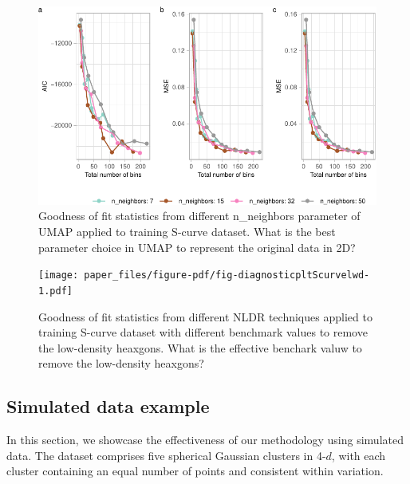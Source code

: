 \documentclass[
  12pt]{article}
\begin{document}
\begin{figure}

{\centering \includegraphics[width=1\textwidth,height=\textheight]{paper_files/figure-pdf/fig-diagnosticpltDiffParam-1.pdf}

}

\caption{\label{fig-diagnosticpltDiffParam}Goodness of fit statistics
from different n\_neighbors parameter of UMAP applied to training
S-curve dataset. What is the best parameter choice in UMAP to represent
the original data in 2D?}

\end{figure}

\begin{figure}

{\centering \texttt{[image: paper\_files/figure-pdf/fig-diagnosticpltScurvelwd-1.pdf]}

}

\caption{\label{fig-diagnosticpltScurvelwd}Goodness of fit statistics
from different NLDR techniques applied to training S-curve dataset with
different benchmark values to remove the low-density heaxgons. What is
the effective benchark valuw to remove the low-density heaxgons?}

\end{figure}

\hypertarget{sec-simpleex}{%
\subsection{Simulated data example}\label{sec-simpleex}}

In this section, we showcase the effectiveness of our methodology using
simulated data. The dataset comprises five spherical Gaussian clusters
in 4-\(d\), with each cluster containing an equal number of points and
consistent within variation.
\end{document}
